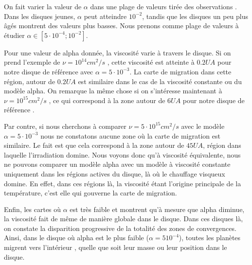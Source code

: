 On fait varier la valeur de $\alpha$ dans une plage de valeurs tirée des observations \citep{guilloteau2011dual}. Dans les
disques jeunes, $\alpha$ peut atteindre $10^{-2}$, tandis que les disques un peu plus âgés \cite[fig.
16]{guilloteau2011dual} montrent des valeurs plus basses. Nous prenons comme plage de valeurs à étudier $\alpha\in[5\cdot
10^{-4} ; 10^{-2}]$. 

Pour une valeur de alpha donnée, la viscosité varie à travers le disque. Si on prend l'exemple de $\nu=10^{14}\unit{cm^2/s}$ , cette viscosité est atteinte à $0.2\unit{UA}$ pour notre disque de référence avec $\alpha=5\cdot 10^{-3}$. La carte de migration dans cette région, autour de $0.2\unit{UA}$ est similaire dans le cas de la viscosité constante ou du modèle alpha. On remarque la même chose si on s'intéresse maintenant à $\nu=10^{15}\unit{cm^2/s}$ , ce qui correspond à la zone autour de $6\unit{UA}$ pour notre disque de référence .

Par contre, si nous cherchons à comparer $\nu=5\cdot 10^{15}\unit{cm^2/s}$  avec le modèle $\alpha=5\cdot 10^{-3}$  nous ne constatons aucune zone où la carte de migration est similaire. Le fait est que cela correspond à la zone autour de $45\unit{UA}$, région dans laquelle l'irradiation domine. Nous voyons donc qu'à viscosité équivalente, nous ne pouvons comparer un modèle alpha avec un modèle à viscosité constante uniquement dans les régions actives du disque, là où le chauffage visqueux domine. En effet, dans ces régions là, la viscosité étant l'origine principale de la température, c'est elle qui gouverne la carte de migration. 

Enfin, les cartes où $\alpha$ est très faible  et  montrent qu'à mesure que alpha
diminue, la viscosité fait de même de manière globale dans le disque. Dans ces disques là, on constate la disparition
progressive de la totalité des zones de convergences. Ainsi, dans le disque où alpha est le plus faible ($\alpha=5 10^{-4}$),
toutes les planètes migrent vers l'intérieur , quelle que soit leur masse ou leur position dans le
disque.

